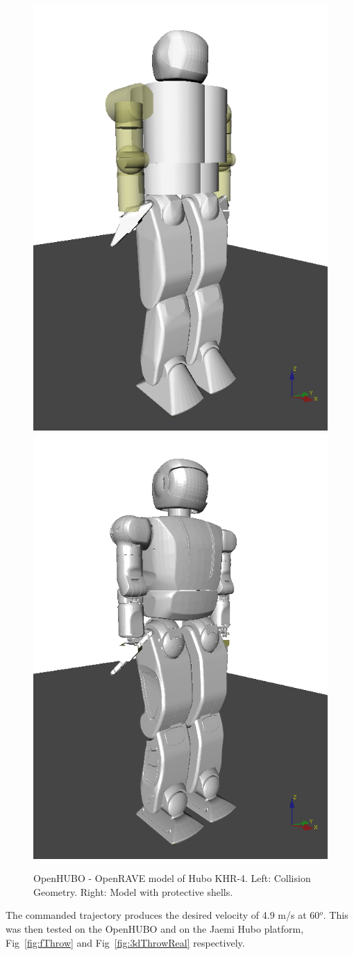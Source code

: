 \begin{figure}[ht]
  \centering
\includegraphics[width=0.4\columnwidth]{./pix/hCol.png}\includegraphics[width=0.4\columnwidth]{./pix/hBody.png}
  \caption{OpenHUBO - OpenRAVE model of Hubo KHR-4.  Left: Collision Geometry.  Right: Model with protective shells\cite{dlofaro-srm}.  }
  \label{fig:vHubo}
\end{figure}

The commanded trajectory produces the desired velocity of 4.9 m/s at 60$^o$.  This was then tested on the OpenHUBO and on the Jaemi Hubo platform, Fig~\ref{fig:fThrow} and Fig~\ref{fig:3dThrowReal} respectively.



